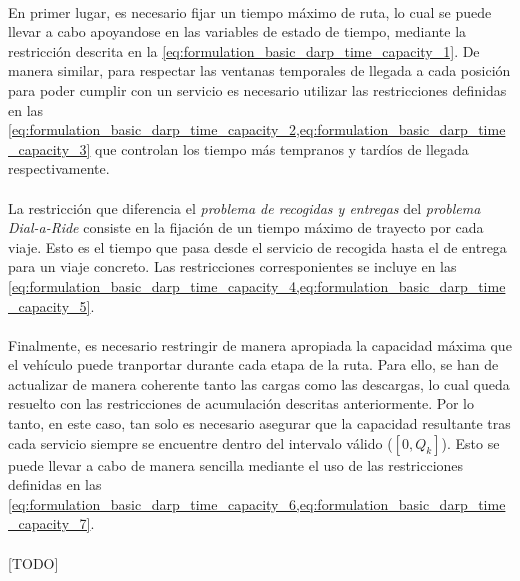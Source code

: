 \documentclass{subfiles}
\begin{document}
        \paragraph{}
        En primer lugar, es necesario fijar un  tiempo máximo de ruta, lo cual se puede llevar a cabo apoyandose en las variables de estado de tiempo, mediante la restricción descrita en la \cref{eq:formulation_basic_darp_time_capacity_1}. De manera similar, para respectar las ventanas temporales de llegada a cada posición para poder cumplir con un servicio es necesario utilizar las restricciones definidas en las \cref{eq:formulation_basic_darp_time_capacity_2,eq:formulation_basic_darp_time_capacity_3} que controlan los tiempo más tempranos y tardíos de llegada respectivamente.

        \paragraph{}
        La restricción que diferencia el \emph{problema de recogidas y entregas} del \emph{problema Dial-a-Ride} consiste en la fijación de un tiempo máximo de trayecto por cada viaje. Esto es el tiempo que pasa desde el servicio de recogida hasta el de entrega para un viaje concreto. Las restricciones corresponientes se incluye en las \cref{eq:formulation_basic_darp_time_capacity_4,eq:formulation_basic_darp_time_capacity_5}.

        \paragraph{}
        Finalmente, es necesario restringir de manera apropiada la capacidad máxima que el vehículo puede tranportar durante cada etapa de la ruta. Para ello, se han de actualizar de manera coherente tanto las cargas como las descargas, lo cual queda resuelto con las restricciones de acumulación descritas anteriormente. Por lo tanto, en este caso, tan solo es necesario asegurar que la capacidad resultante tras cada servicio siempre se encuentre dentro del intervalo válido ($[0, Q_{k}]$). Esto se puede llevar a cabo de manera sencilla mediante el uso de las restricciones definidas en las \cref{eq:formulation_basic_darp_time_capacity_6,eq:formulation_basic_darp_time_capacity_7}.

      \paragraph{}
      [TODO]
\end{document}
